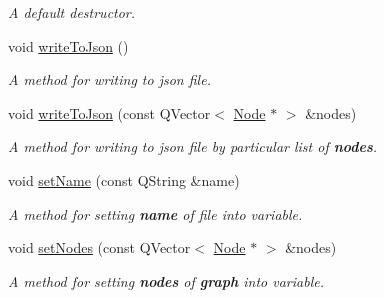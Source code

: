 \begin{DoxyCompactItemize}
\begin{DoxyCompactList}\small\item\em A {\itshape default} {\itshape destructor}. \end{DoxyCompactList}\item 
\mbox{\label{class_json_writer_a02d176c354e11837f771a3e80fe80094}} 
void \mbox{\hyperlink{class_json_writer_a02d176c354e11837f771a3e80fe80094}{write\+To\+Json}} ()
\begin{DoxyCompactList}\small\item\em A {\itshape method} for writing to {\itshape json} {\itshape file}. \end{DoxyCompactList}\item 
\mbox{\label{class_json_writer_a1098975c6b90a6b6756c44ac18da75a4}} 
void \mbox{\hyperlink{class_json_writer_a1098975c6b90a6b6756c44ac18da75a4}{write\+To\+Json}} (const Q\+Vector$<$ \mbox{\hyperlink{class_node}{Node}} $\ast$ $>$ \&nodes)
\begin{DoxyCompactList}\small\item\em A {\itshape method} for writing to {\itshape json} {\itshape file} by particular list of {\bfseries{nodes}}. \end{DoxyCompactList}\item 
\mbox{\label{class_json_writer_a0f7d5d7e07a50c029d167257742e3003}} 
void \mbox{\hyperlink{class_json_writer_a0f7d5d7e07a50c029d167257742e3003}{set\+Name}} (const Q\+String \&name)
\begin{DoxyCompactList}\small\item\em A {\itshape method} for setting {\bfseries{name}} of {\itshape file} into variable. \end{DoxyCompactList}\item 
\mbox{\label{class_json_writer_a6d7cd109ecc4d499c745472441184550}} 
void \mbox{\hyperlink{class_json_writer_a6d7cd109ecc4d499c745472441184550}{set\+Nodes}} (const Q\+Vector$<$ \mbox{\hyperlink{class_node}{Node}} $\ast$ $>$ \&nodes)
\begin{DoxyCompactList}\small\item\em A {\itshape method} for setting {\bfseries{nodes}} of {\bfseries{graph}} into variable. \end{DoxyCompactList}\end{DoxyCompactItemize}
